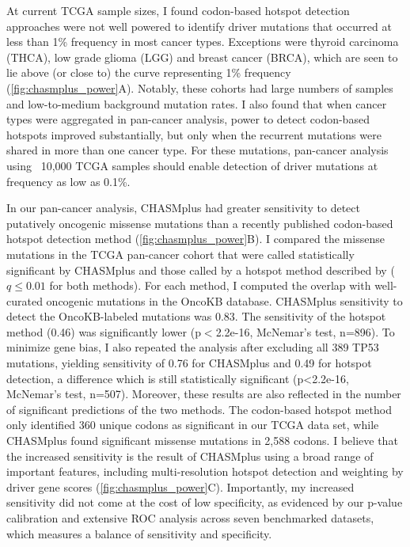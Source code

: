 At current TCGA sample sizes, I found codon-based hotspot detection approaches were not well powered to identify driver mutations that occurred at less than 1\% frequency in most cancer types.  Exceptions were thyroid carcinoma (THCA), low grade glioma (LGG) and breast cancer (BRCA), which are seen to lie above (or close to) the curve representing 1\% frequency (\autoref{fig:chasmplus_power}A).  Notably, these cohorts had large numbers of samples and low-to-medium background mutation rates.  I also found that when cancer types were aggregated in pan-cancer analysis, power to detect codon-based hotspots improved substantially, but only when the recurrent mutations were shared in more than one cancer type.  For these mutations, pan-cancer analysis using ~10,000 TCGA samples should enable detection of driver mutations at frequency as low as 0.1\%.   

In our pan-cancer analysis, CHASMplus had greater sensitivity to detect putatively oncogenic missense mutations than a recently published codon-based hotspot detection method (\autoref{fig:chasmplus_power}B). I compared the missense mutations in the TCGA pan-cancer cohort that were called statistically significant by CHASMplus and those called by a hotspot method described by \cite{RN23} ($q\leq 0.01$ for both methods).  For each method, I computed the overlap with well-curated oncogenic mutations in the OncoKB database.  CHASMplus sensitivity to detect the OncoKB-labeled mutations was 0.83.  The sensitivity of the hotspot method (0.46) was significantly lower (p$<$2.2e-16, McNemar's test, n=896).  To minimize gene bias, I also repeated the analysis after excluding all 389 TP53 mutations, yielding sensitivity of 0.76 for CHASMplus and 0.49 for hotspot detection, a difference which is still statistically significant (p<2.2e-16, McNemar's test, n=507). Moreover, these results are also reflected in the number of significant predictions of the two methods.  The codon-based hotspot method only identified 360 unique codons as significant in our TCGA data set, while CHASMplus found significant missense mutations in 2,588 codons. I believe that the increased sensitivity is the result of CHASMplus using a broad range of important features, including multi-resolution hotspot detection and weighting by driver gene scores (\autoref{fig:chasmplus_power}C).  Importantly, my increased sensitivity did not come at the cost of low specificity, as evidenced by our p-value calibration and extensive ROC analysis across seven benchmarked datasets, which measures a balance of sensitivity and specificity.

